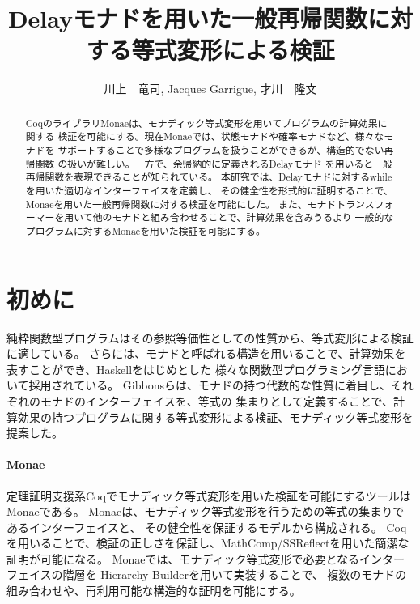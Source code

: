 \documentclass[japanese]{jssst_ppl}
\title{Delayモナドを用いた一般再帰関数に対する等式変形による検証}
\author{川上　竜司, Jacques Garrigue, 才川　隆文}
\theoremstyle{definition}
\begin{document}
\maketitle
\begin{abstract}
  CoqのライブラリMonaeは、モナディック等式変形を用いてプログラムの計算効果に関する
  検証を可能にする。現在Monaeでは、状態モナドや確率モナドなど、様々なモナドを
  サポートすることで多様なプログラムを扱うことができるが、構造的でない再帰関数
  の扱いが難しい。一方で、余帰納的に定義されるDelayモナド
  を用いると一般再帰関数を表現できることが知られている。
  本研究では、Delayモナドに対するwhileを用いた適切なインターフェイスを定義し、
  その健全性を形式的に証明することで、Monaeを用いた一般再帰関数に対する検証を可能にした。
  また、モナドトランスフォーマーを用いて他のモナドと組み合わせることで、計算効果を含みうるより
  一般的なプログラムに対するMonaeを用いた検証を可能にする。
\end{abstract}

\section{初めに}
純粋関数型プログラムはその参照等価性としての性質から、等式変形による検証に適している。
さらには、モナドと呼ばれる構造を用いることで、計算効果を表すことができ、Haskellをはじめとした
様々な関数型プログラミング言語において採用されている。
Gibbonsらは、モナドの持つ代数的な性質に着目し、それぞれのモナドのインターフェイスを、等式の
集まりとして定義することで、計算効果の持つプログラムに関する等式変形による検証、モナディック等式変形を
提案した\cite{10.1145/2034574.2034777}。


\paragraph{Monae}
定理証明支援系Coqでモナディック等式変形を用いた検証を可能にするツールはMonae\cite{monae}である。
Monaeは、モナディック等式変形を行うための等式の集まりであるインターフェイスと、
その健全性を保証するモデルから構成される。
Coqを用いることで、検証の正しさを保証し、MathComp/SSReflectを用いた簡潔な証明が可能になる。
Monaeでは、モナディック等式変形で必要となるインターフェイスの階層を
Hierarchy Builder\cite{cohen:hal-02478907}を用いて実装することで、
複数のモナドの組み合わせや、再利用可能な構造的な証明を可能にする。
\end{document}
